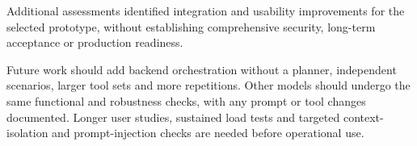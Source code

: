 Additional assessments identified integration and usability improvements for the selected prototype, without establishing comprehensive security, long-term acceptance or production readiness.

Future work should add backend orchestration without a planner, independent scenarios, larger tool sets and more repetitions.
Other models should undergo the same functional and robustness checks, with any prompt or tool changes documented.
Longer user studies, sustained load tests and targeted context-isolation and prompt-injection checks are needed before operational use.
